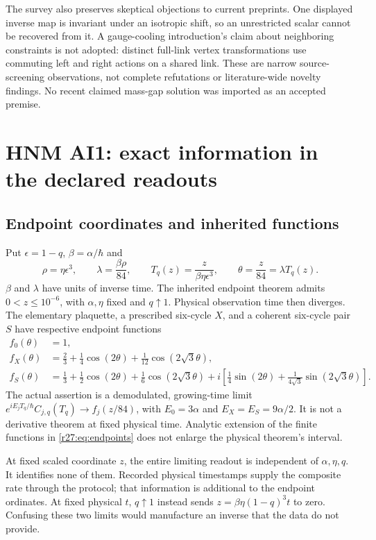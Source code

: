 The survey also preserves skeptical objections to current preprints. One displayed inverse map is invariant under an isotropic shift, so an unrestricted scalar cannot be recovered from it. A gauge-cooling introduction's claim about neighboring constraints is not adopted: distinct full-link vertex transformations use commuting left and right actions on a shared link. These are narrow source-screening observations, not complete refutations or literature-wide novelty findings. No recent claimed mass-gap solution was imported as an accepted premise.

\section{HNM AI1: exact information in the declared readouts\workstar}
\subsection{Endpoint coordinates and inherited functions}
Put $\epsilon=1-q$, $\beta=\alpha/\hbar$ and
\begin{equation}
\rho=\eta\epsilon^3,\qquad \lambda=\frac{\beta\rho}{84},\qquad
T_q(z)=\frac{z}{\beta\eta\epsilon^3},\qquad \theta=\frac{z}{84}=\lambda T_q(z).
\label{r27:eq:clock}
\end{equation}
$\beta$ and $\lambda$ have units of inverse time. The inherited endpoint theorem admits $0<z\le10^{-6}$, with $\alpha,\eta$ fixed and $q\uparrow1$. Physical observation time then diverges. The elementary plaquette, a prescribed six-cycle $X$, and a coherent six-cycle pair $S$ have respective endpoint functions
\begin{align}
f_0(\theta)&=1,\nonumber\\
f_X(\theta)&=\frac23+\frac14\cos(2\theta)+\frac1{12}\cos(2\sqrt3\theta),\nonumber\\
f_S(\theta)&=\frac13+\frac12\cos(2\theta)+\frac16\cos(2\sqrt3\theta)
+i\left[\frac14\sin(2\theta)+\frac1{4\sqrt3}\sin(2\sqrt3\theta)\right].
\label{r27:eq:endpoints}
\end{align}
The actual assertion is a demodulated, growing-time limit
$e^{iE_jT_q/\hbar}C_{j,q}(T_q)\to f_j(z/84)$, with
$E_0=3\alpha$ and $E_X=E_S=9\alpha/2$. It is not a derivative theorem at fixed physical time. Analytic extension of the finite functions in \eqref{r27:eq:endpoints} does not enlarge the physical theorem's interval.

At fixed scaled coordinate $z$, the entire limiting readout is independent of $\alpha,\eta,q$. It identifies none of them. Recorded physical timestamps supply the composite rate through the protocol; that information is additional to the endpoint ordinates. At fixed physical $t$, $q\uparrow1$ instead sends $z=\beta\eta(1-q)^3t$ to zero. Confusing these two limits would manufacture an inverse that the data do not provide.

